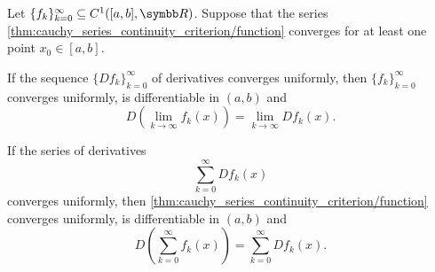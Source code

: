 \begin{corollary}\label{thm:derivative_limit_exchange}\cite[theorem 7.17]{Rudin1976}
  Let \( \{ f_k \}_{k=0}^\infty \subseteq C^1([a, b], \R) \). Suppose that the series \cref{thm:cauchy_series_continuity_criterion/function} converges for at least one point \( x_0 \in [a, b] \).

  \begin{thmenum}
     If the sequence \( \{ D f_k \}_{k=0}^\infty \) of derivatives converges uniformly, then \( \{ f_k \}_{k=0}^\infty \) converges uniformly, is differentiable in \( (a, b) \) and
    \begin{equation*}
      D\left(\lim_{k \to \infty} f_k(x) \right) = \lim_{k \to \infty} D f_k(x).
    \end{equation*}

     If the series of derivatives
    \begin{equation}\label{thm:derivative_limit_exchange/derivative_series}
      \sum_{k=0}^\infty D f_k(x)
    \end{equation}
    converges uniformly, then \cref{thm:cauchy_series_continuity_criterion/function} converges uniformly, is differentiable in \( (a, b) \) and
    \begin{equation*}
      D\left(\sum_{k=0}^\infty f_k(x)\right) = \sum_{k=0}^\infty D f_k(x).
    \end{equation*}
  \end{thmenum}
\end{corollary}
